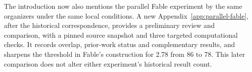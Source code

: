 The introduction now also mentions the parallel Fable experiment by the
same organizers under the same local conditions. A new
Appendix~\ref{app:parallel-fable}, after the historical correspondence,
provides a preliminary review and comparison, with a pinned source
snapshot and three targeted computational checks. It records overlap,
prior-work status and complementary results, and sharpens the threshold
in Fable's construction for 2.78 from 86 to 78. This later comparison
does not alter either experiment's historical result count.
